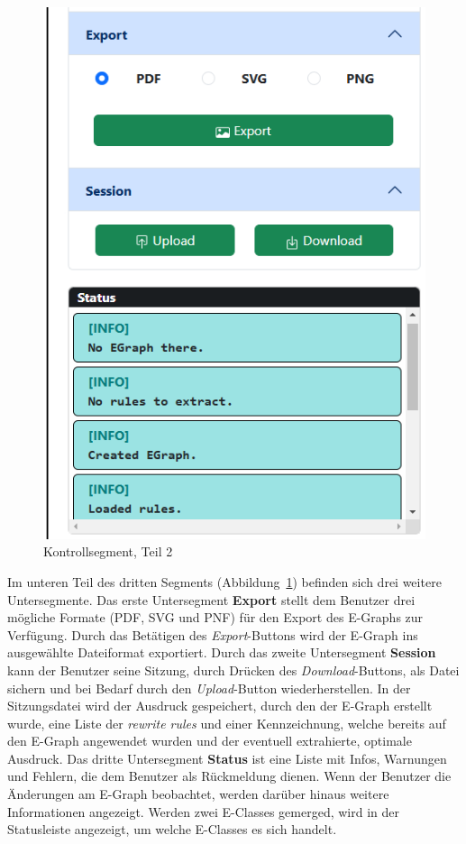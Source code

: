 \begin{figure}
    \vspace{-10mm}
    \begin{center}
      \includegraphics[scale=0.6]{../fig/control2.png}
    \end{center}
    \caption{Kontrollsegment, Teil 2}
    \label{fig:segment32}
\end{figure}

Im unteren Teil des dritten Segments (Abbildung~\ref{fig:segment32}) befinden sich drei weitere Untersegmente.  
Das erste Untersegment \textbf{Export} stellt dem Benutzer drei mögliche Formate (PDF, SVG und PNF) für den Export des E-Graphs zur Verfügung. Durch das Betätigen des \textit{Export}-Buttons
wird der E-Graph ins ausgewählte Dateiformat exportiert.
Durch das zweite Untersegment \textbf{Session} kann der Benutzer seine Sitzung, durch Drücken des \textit{Download}-Buttons, als Datei sichern und bei Bedarf durch den \textit{Upload}-Button
wiederherstellen. In der Sitzungsdatei wird der Ausdruck gespeichert, durch den der E-Graph erstellt wurde, eine Liste der \textit{rewrite rules} und einer Kennzeichnung, welche 
bereits auf den E-Graph angewendet wurden und der eventuell extrahierte, optimale Ausdruck.
Das dritte Untersegment \textbf{Status} ist eine Liste mit Infos, Warnungen und Fehlern, die dem Benutzer als Rückmeldung dienen. Wenn der Benutzer die Änderungen am E-Graph beobachtet, werden
darüber hinaus weitere Informationen angezeigt. Werden zwei E-Classes gemerged, wird in der Statusleiste angezeigt, um welche E-Classes es sich handelt.  

